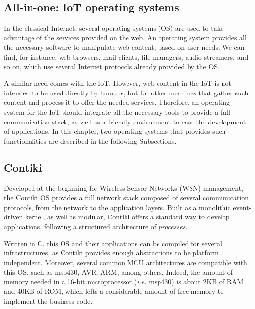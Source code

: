 \subsection{All-in-one: IoT operating systems}
\label{subsec:IoTOS}
In the classical Internet, several operating systems (OS) are used to take advantage of the services provided on the web.
An operating system provides all the necessary software to manipulate web content, based on user needs.
We can find, for instance, web browsers, mail clients, file managers, audio streamers, and so on, which use several Internet protocols already provided by the OS.

A similar need comes with the IoT.
However, web content in the IoT is not intended to be used directly by humans, but for other machines that gather such content and process it to offer the needed services.
Therefore, an operating system for the IoT should integrate all the necessary tools to provide a full communication stack, as well as a friendly environment to ease the development of applications.
In this chapter, two operating systems that provides such functionalities are described in the following Subsections.

\subsection{Contiki}
\label{subsec:contiki}
Developed at the beginning for Wireless Sensor Networks (WSN) management, the Contiki OS\cite{dunkels2004contiki} provides a full network stack composed of several communication protocols, from the network to the application layers.
Built as a monolithic event-driven kernel, as well as modular, Contiki offers a standard way to develop applications, following a structured architecture of \textit{processes}.

Written in C, this OS and their applications can be compiled for several infrastructures, as Contiki provides enough abstractions to be platform independent.
Moreover, several common MCU architectures are compatible with this OS, such as msp430, AVR, ARM, among others.
Indeed, the amount of memory needed in a 16-bit microprocessor (\textit{i.e.} msp430) is about 2KB of RAM and 40KB of ROM, which lefts a considerable amount of free memory to implement the business code.

